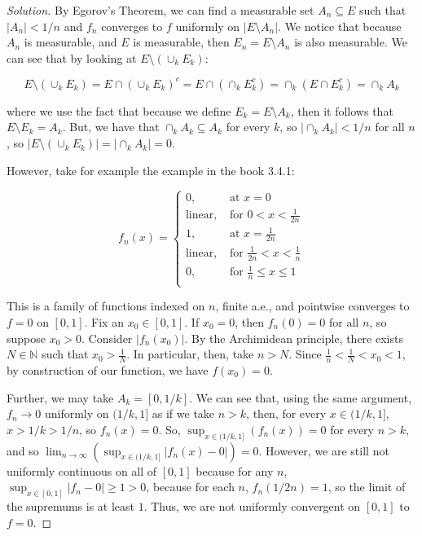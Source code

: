 \documentclass[10pt]{article}
\begin{document}
\begin{proof}[Solution]

By Egorov's Theorem, we can find a measurable set $A_n \subseteq E$ such that $|A_n| < 1/n$ and $f_n$ converges to $f$ uniformly on $|E \setminus A_n|$. We notice that because $A_n$ is measurable, and $E$ is measurable, then $E_n = E \setminus A_n$ is also measurable. We can see that by looking at $E \setminus (\cup_k E_k)$:

$$ E \setminus (\cup_k E_k) = E \cap (\cup_k E_k)^c =  E \cap (\cap_k E_k^c) = \cap_k (E \cap E_k^c) = \cap_k A_k $$

where we use the fact that because we define $E_k = E \setminus A_k$, then it follows that $E \setminus E_k = A_k$. But, we have that $\cap_k A_k \subseteq A_k$ for every $k$, so $|\cap_k A_k| < 1/n$ for all $n$, so $|E \setminus (\cup_k E_k)| =  |\cap_k A_k| = 0$.

However, take for example the example in the book 3.4.1:

$$ f_n(x) = \begin{cases} 0, & \text{ at } x= 0 \\
\text{linear}, & \text{ for } 0 < x < \frac{1}{2n} \\
1, & \text{ at } x = \frac{1}{2n} \\
\text{linear}, & \text{ for } \frac{1}{2n} < x < \frac{1}{n} \\
0, & \text{ for } \frac{1}{n} \leq x \leq 1 \\
\end{cases} $$

This is a family of functions indexed on $n$, finite a.e., and pointwise converges to $f = 0$ on $[0,1]$. Fix an $x_0 \in [0,1]$. If $x_0 = 0$, then $f_n(0) = 0$ for all $n$, so suppose $x_0 > 0$. Consider $|f_n(x_0)|$. By the Archimidean principle, there exists $N \in \mathbb{N}$ such that $x_0 > \frac{1}{N}$. In particular, then, take $n > N$. Since $\frac{1}{n} < \frac{1}{N} < x_0 < 1$, by construction of our function, we have $f(x_0) = 0$.

Further, we may take $A_k = [0,1/k]$. We can see that, using the same argument, $f_n \to 0$ uniformly on $(1/k,1]$ as if we take $n > k$, then, for every $x \in (1/k,1]$, $x > 1/k > 1/n$, so $f_n(x) = 0$. So, $\sup_{x \in (1/k,1]} (f_n(x)) = 0$ for every $n > k$, and so $\lim_{n \to \infty} ( \sup_{x \in (1/k,1]} |f_n(x) - 0|) = 0$. However, we are still not uniformly continuous on all of $[0,1]$ because for any $n$, $\sup_{x \in [0,1]} | f_n  - 0|  \geq 1 > 0$, because for each $n$, $f_n(1/2n) = 1$, so the limit of the supremums is at least $1$. Thus, we are not uniformly convergent on $[0,1]$ to $f = 0$.

\end{proof}
\end{document}
